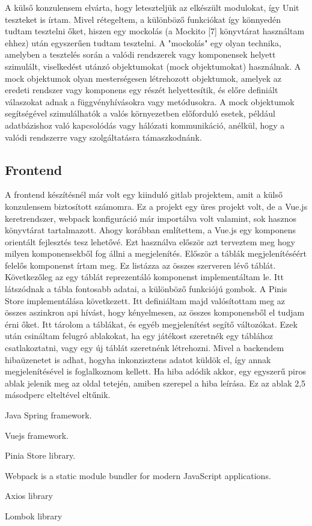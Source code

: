 \documentclass[a4paper,twoside]{article}
\begin{document}
A külső konzulensem elvárta, hogy leteszteljük az elkészült modulokat, így Unit teszteket is
írtam. Mivel rétegeltem, a különböző funkciókat így könnyedén tudtam tesztelni őket, hiszen
egy mockolás (a Mockito [7] könyvtárat használtam ehhez) után egyszerűen tudtam tesztelni.
A "mockolás" egy olyan technika, amelyben a tesztelés során a valódi rendszerek vagy
komponensek helyett szimulált, viselkedést utánzó objektumokat (mock objektumokat) használnak.
A mock objektumok olyan mesterségesen létrehozott objektumok, amelyek az
eredeti rendszer vagy komponens egy részét helyettesítik, és előre definiált válaszokat adnak a
függvényhívásokra vagy metódusokra. A mock objektumok segítségével szimulálhatók a
valós környezetben előforduló esetek, például adatbázishoz való kapcsolódás vagy hálózati
kommunikáció, anélkül, hogy a valódi rendszerre vagy szolgáltatásra támaszkodnánk. 

\subsection{Frontend}
A frontend készítésnél már volt egy kiinduló gitlab projektem, amit a külső konzulensem
biztosított számomra. Ez a projekt egy üres projekt volt, de a Vue.js keretrendszer, webpack
konfiguráció már importálva volt valamint, sok hasznos könyvtárat tartalmazott. Ahogy
korábban említettem, a Vue.js egy komponens orientált fejlesztés tesz lehetővé. Ezt használva
először azt terveztem meg hogy milyen komponensekből fog állni a megjelenítés.
Először a táblák megjelenítéséért felelős komponenst írtam meg. Ez listázza az összes
szerveren lévő táblát.
Következőleg az egy táblát reprezentáló komponenst implementáltam le. Itt látszódnak a tábla
fontosabb adatai, a különböző funkciójú gombok.
A Pinis Store implementálása következett. Itt definiáltam majd valósítottam meg az összes
aszinkron api hívást, hogy kényelmesen, az összes komponensből el tudjam érni őket. Itt
tárolom a táblákat, és egyéb megjelenítést segítő változókat.
Ezek után csináltam felugró ablakokat, ha egy játékost szeretnék egy táblához csatlakoztatni,
vagy egy új táblát szeretnénk létrehozni.
Mivel a backendem hibaüzenetet is adhat, hogyha inkonzisztens adatot küldök el, így annak
megjelenítésével is foglalkoznom kellett. Ha hiba adódik akkor, egy egyszerű piros ablak
jelenik meg az oldal tetején, amiben szerepel a hiba leírása. Ez az ablak 2,5 másodperc
elteltével eltűnik.



\newpage
\begin{thebibliography}{9}
	Java Spring framework.
	
	Vuejs framework.
	
	Pinia Store library.
	
	 Webpack is a static module bundler for modern JavaScript applications.
	 
	 Axios library
	 
	 Lombok library
\end{thebibliography}
\end{document}
